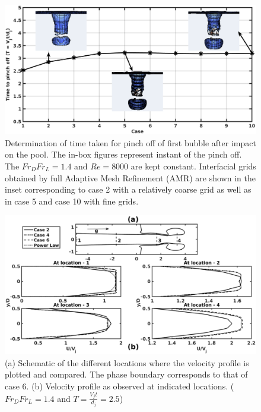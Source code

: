 \begin{figure}
	\centering
	\includegraphics[width=\linewidth]{chapters/jetPool/Figure4}
	\caption{Determination of time taken for pinch off of first bubble after impact on the pool. The in-box figures represent instant of the pinch off. The $Fr_DFr_L  = 1.4 $ and $Re = 8000$ are kept constant. Interfacial grids obtained by full Adaptive Mesh Refinement (AMR) are shown in the inset corresponding to case 2 with a relatively coarse grid as well as in case 5 and case 10 with fine grids.}
	\label{Figure::GIS}
\end{figure}
\begin{figure}
	\centering
	\includegraphics[width=\linewidth]{chapters/jetPool/Figure5}
	\caption{(a) Schematic of the different locations where the velocity profile is plotted and compared. The phase boundary corresponds to that of case 6. (b) Velocity profile as observed at indicated locations. ($Fr_DFr_L = 1.4$ and $T = \frac{V_jt}{d_j} = 2.5$)}
	\label{Figure::gisvel}
\end{figure}

